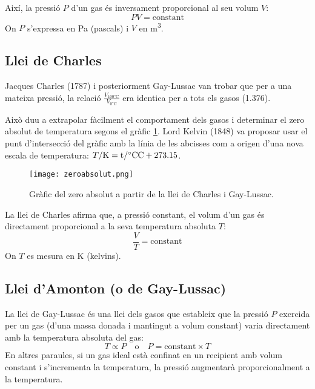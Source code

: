 Així, la pressió \( P \) d'un gas és inversament proporcional al seu volum \( V \):
\begin{equation}
    P V = \text{constant}
\end{equation}
On \( P \) s'expressa en \si{Pa} (pascals) i \( V \) en \si{m^3}.

\subsection{Llei de Charles}

Jacques Charles (1787) i posteriorment Gay-Lussac van trobar que per a una mateixa pressió, la relació $\frac{V_{100 \si\degreeCelsius}}{V_{0 \si\degreeCelsius}}$ era identica per a tots els gasos (1.376).

Això duu a extrapolar fàcilment el comportament dels gasos i determinar el zero absolut de temperatura segons el gràfic \ref{fig:zeroabsolut}. Lord Kelvin (1848) va proposar usar el punt d'intersecció del gràfic amb la línia de les abcisses com a origen d'una nova escala de temperatura: $T/\rm{K} = t/\si\degreeCelsius \rm{C} + 273.15$.
\begin{figure}[h]
\centering
\texttt{[image: zeroabsolut.png]}
\caption{Gràfic del zero absolut a partir de la llei de Charles i Gay-Lussac.}
\label{fig:zeroabsolut}
\end{figure}

La llei de Charles afirma que, a pressió constant, el volum d'un gas és directament proporcional a la seva temperatura absoluta \( T \):
\begin{equation}
    \frac{V}{T} = \text{constant}
\end{equation}
On \( T \) es mesura en \si{K} (kelvins).

\subsection{Llei d'Amonton (o de Gay-Lussac)}
La llei de Gay-Lussac és una llei dels gasos que estableix que la pressió \( P \) exercida per un gas (d'una massa donada i mantingut a volum constant) varia directament amb la temperatura absoluta del gas:
\begin{equation}
    T \propto P \quad \text{o} \quad P = \text{constant} \times T
\end{equation}
En altres paraules, si un gas ideal està confinat en un recipient amb volum constant i s'incrementa la temperatura, la pressió augmentarà proporcionalment a la temperatura.

